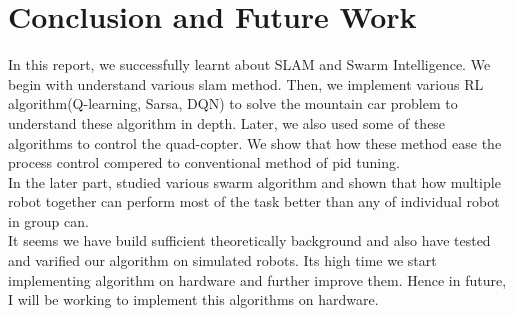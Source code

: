\chapter{Conclusion and Future Work}

In this report, we successfully learnt about SLAM and Swarm Intelligence. We begin with understand various slam method. Then, we implement various RL algorithm(Q-learning, Sarsa, DQN) to solve the mountain car problem to understand these algorithm in depth. Later, we also used some of these algorithms to control the quad-copter. We show that how these method ease the process control compered to conventional method of pid tuning.\\
In the later part, studied various swarm algorithm and shown that how multiple robot together can perform most of the task better than any of individual robot in group can.\\

It seems we have build sufficient theoretically background and also have tested and varified our algorithm on simulated robots. Its high time we start implementing algorithm on hardware and further improve them. Hence in future, I will be working to implement this algorithms on hardware.\\